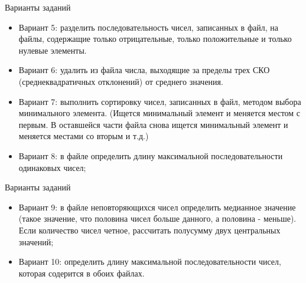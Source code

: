 \documentclass{beamer}
\begin{document}
\begin{frame}{Варианты заданий}
\begin{itemize}
\item Вариант 5: разделить последовательность чисел, записанных в файл, на файлы, содержащие только отрицательные, только положительные и только нулевые элементы.
\item Вариант 6: удалить из файла числа, выходящие за пределы трех СКО (среднеквадратичных отклонений) от среднего значения.
\item Вариант 7: выполнить сортировку чисел, записанных в файл, методом выбора минимального элемента. (Ищется минимальный элемент и меняется местом с первым. В оставшейся части файла снова ищется минимальный элемент и меняется местами со вторым и т.д.)
\item Вариант 8: в файле определить длину максимальной последовательности одинаковых чисел;
\end{itemize}
\end{frame}

\begin{frame}{Варианты заданий}
\begin{itemize}
\item Вариант 9: в файле неповторяющихся чисел определить медианное значение (такое значение, что половина чисел больше данного, а половина - меньше). Если количество чисел четное, рассчитать полусумму двух центральных значений;
\item Вариант 10: определить длину максимальной последовательности чисел, которая содерится в обоих файлах.
\end{itemize}
\end{frame}
\end{document}

